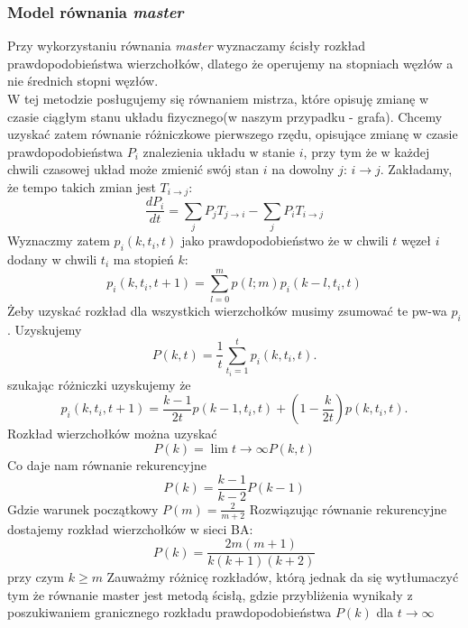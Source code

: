 \documentclass{article}
\begin{document}
\subsubsection{Model równania \textit{master}}
	Przy wykorzystaniu równania \textit{master} wyznaczamy ścisły rozkład prawdopodobieństwa wierzchołków, dlatego że operujemy na stopniach węzłów a nie średnich stopni węzłów.\\W tej metodzie posługujemy się równaniem mistrza, które opisuję zmianę w czasie ciągłym  stanu układu fizycznego(w naszym przypadku - grafa). Chcemy uzyskać zatem równanie różniczkowe pierwszego rzędu, opisujące zmianę w czasie prawdopodobieństwa $P_i$ znalezienia układu w stanie $i$, przy tym że w każdej chwili czasowej układ może zmienić swój stan $i$ na dowolny $j$: $ i \rightarrow j$. Zakładamy, że tempo takich zmian jest $T_{i \rightarrow j}$:
	\begin{equation}
	\frac{dP_i}{dt} = \sum_{j} P_jT_{j \rightarrow i} - \sum_{j} P_iT_{i \rightarrow j}
	\end{equation}
	Wyznaczmy zatem $p_i(k, t_i, t)$ jako prawdopodobieństwo że w chwili $t$ węzeł $i$ dodany w chwili $t_i$ ma stopień $k$:
	\begin{equation}\label{prw}
		p_i(k, t_i, t + 1) = \sum_{l=0}^m p(l;m)p_i(k - l, t_i, t)		
	\end{equation}
	Żeby uzyskać rozkład dla wszystkich wierzchołków musimy zsumować te pw-wa $p_i$. Uzyskujemy 
	\begin{equation}
		P(k, t) = \frac{1}{t} \sum_{t_i=1}^t p_i(k,t_i,t).
	\end{equation}
	szukając różniczki uzyskujemy że 
	\begin{equation}
		p_i(k, t_i, t + 1) = \frac{k - 1}{2t}p(k - 1, t_i, t) + (1 - \frac{k}{2t})p(k,t_i, t).
	\end{equation}
	Rozkład wierzchołków można uzyskać 
	\begin{equation}
		P(k) = \lim {t \to \infty} P(k, t)
	\end{equation}
	Co daje nam równanie rekurencyjne
	\begin{equation}
		P(k) = \frac{k - 1}{k - 2}P(k -1)
	\end{equation}
	Gdzie warunek początkowy $P(m) = \frac{2}{m + 2}$
	Rozwiązując równanie rekurencyjne dostajemy rozkład wierzchołków w sieci BA:
	\begin{equation}
		P(k) = \frac{2m(m + 1)}{k(k + 1)(k + 2)}
	\end{equation}
	przy czym $k \geq m$
Zauważmy różnicę rozkładów, którą jednak da się wytłumaczyć tym że równanie master jest metodą ścisłą, gdzie przybliżenia wynikały z poszukiwaniem granicznego rozkładu prawdopodobieństwa $P(k)$ dla $t \rightarrow \infty$
{}

\end{document}
